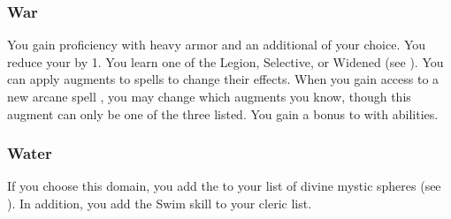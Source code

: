         \subsubsection{War}
             You gain proficiency with heavy armor and an additional  of your choice.
             You reduce your  by 1.
             You learn one of the Legion, Selective, or Widened  (see ).
            You can apply augments to spells to change their effects.
            When you gain access to a new arcane spell , you may change which augments you know, though this augment can only be one of the three listed.
             You gain a  bonus to  with  abilities.

        \subsubsection{Water}
            If you choose this domain, you add the   to your list of divine mystic spheres (see ).
            In addition, you add the Swim skill to your cleric  list.

